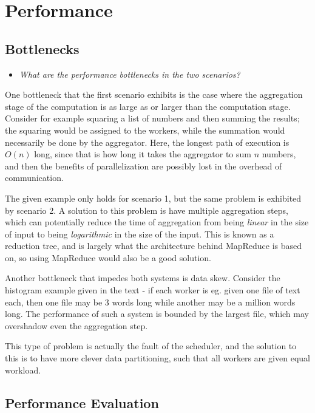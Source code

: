 \newpage
\section{Performance}

\subsection{Bottlenecks}

\begin{itemize}
  \item \textit{What are the performance bottlenecks in the two scenarios?}
\end{itemize}

One bottleneck that the first scenario exhibits is the case where the
aggregation stage of the computation is as large as or larger than the
computation stage. Consider for example squaring a list of numbers and then
summing the results; the squaring would be assigned to the workers, while the
summation would necessarily be done by the aggregator. Here, the longest path of
execution is $O(n)$ long, since that is how long it takes the aggregator to sum
$n$ numbers, and then the benefits of parallelization are possibly lost in the
overhead of communication.
\medskip

The given example only holds for scenario 1, but the same problem is exhibited
by scenario 2. A solution to this problem is have multiple aggregation steps,
which can potentially reduce the time of aggregation from being \emph{linear} in
the size of input to being \emph{logarithmic} in the size of the input. This is
known as a reduction tree, and is largely what the architecture behind MapReduce
is based on, so using MapReduce would also be a good solution.
\bigskip

Another bottleneck that impedes both systems is data skew. Consider the
histogram example given in the text - if each worker is eg. given one file of
text each, then one file may be 3 words long while another may be a million
words long. The performance of such a system is bounded by the largest file,
which may overshadow even the aggregation step.
\smallskip

This type of problem is actually the fault of the scheduler, and the solution to
this is to have more clever data partitioning, such that all workers are given
equal workload.
\sectend

\subsection{Performance Evaluation}

